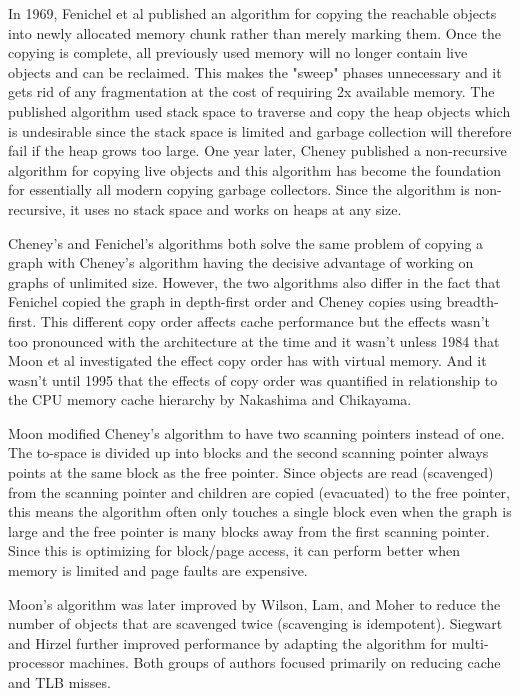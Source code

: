 \documentclass[a4paper,oneside]{memoir}
\begin{document}
In 1969, Fenichel et al published an algorithm for copying the reachable objects
into newly allocated memory chunk rather than merely marking them.\cite{Fenichel} Once the copying
is complete, all previously used memory will no longer contain live objects
and can be reclaimed. This makes the "sweep" phases unnecessary and it gets rid
of any fragmentation at the cost of requiring 2x available memory. The published
algorithm used stack space to traverse and copy the heap objects which is
undesirable since the stack space is limited and garbage collection will therefore
fail if the heap grows too large. One year later, Cheney published a non-recursive
algorithm for copying live objects and this algorithm has become the foundation
for essentially all modern copying garbage collectors. Since the algorithm is
non-recursive, it uses no stack space and works on heaps at any size.

Cheney's and Fenichel's algorithms both solve the same problem of copying a graph
with Cheney's algorithm having the decisive advantage of working on graphs of
unlimited size. However, the two algorithms also differ in the fact that Fenichel
copied the graph in depth-first order and Cheney copies using breadth-first. This
different copy order affects cache performance but the effects wasn't too pronounced
with the architecture at the time and it wasn't unless 1984 that Moon et al
investigated the effect copy order has with virtual memory. And it wasn't until
1995 that the effects of copy order was quantified in relationship to the
CPU memory cache hierarchy by Nakashima and Chikayama.

Moon modified Cheney's algorithm to have two scanning pointers instead of one.
The to-space is divided up into blocks and the second scanning pointer always
points at the same block as the free pointer. Since objects are read (scavenged)
from the scanning pointer and children are copied (evacuated) to the free pointer,
this means the algorithm often only touches a single block even when the graph
is large and the free pointer is many blocks away from the first scanning pointer.
Since this is optimizing for block/page access, it can perform better when memory
is limited and page faults are expensive.

Moon's algorithm was later improved by Wilson, Lam, and Moher to reduce the
number of objects that are scavenged twice (scavenging is idempotent). Siegwart
and Hirzel further improved performance by adapting the algorithm for
multi-processor machines. Both groups of authors focused primarily on reducing
cache and TLB misses.
\end{document}
